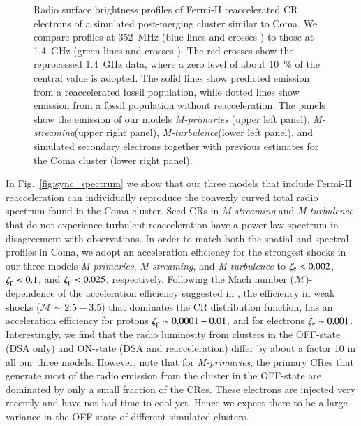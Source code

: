 \documentclass[useAMS,usenatbib]{mn2e}
\newcommand{\Mstream}{{\it M-streaming}\xspace}
\newcommand{\Mflatturb}{{\it M-turbulence}\xspace}
\newcommand{\Mprimary}{{\it M-primaries}\xspace}
\begin{document}
\begin{figure}
\begin{minipage}{1\columnwidth}
\begin{center}
   \end{center}
\end{minipage}
\caption{Radio surface brightness profiles of Fermi-II reaccelerated
  CR electrons of a simulated post-merging cluster similar to Coma. We
  compare profiles at 352~MHz (blue lines and crosses \citet{brown11})
  to those at 1.4~GHz (green lines and crosses \citet{deiss97}). The
  red crosses show the reprocessed 1.4~GHz data, where a zero level of
  about 10~\% of the central value is adopted. The solid lines show
  predicted emission from a reaccelerated fossil population, while
  dotted lines show emission from a fossil population without
  reacceleration. The panels show the emission of our models \Mprimary
  (upper left panel), \Mstream (upper right panel), \Mflatturb (lower
  left panel), and simulated secondary electrons together with
  previous estimates \citet{brunetti12} for the Coma cluster (lower
  right panel).}
  \label{fig:sync_profile}
\end{figure}

In Fig.~\ref{fig:sync_spectrum} we show that our three models that
include Fermi-II reacceleration can individually reproduce the
convexly curved total radio spectrum found in the Coma cluster. Seed
CRs in \Mstream and \Mflatturb that do not experience turbulent
reacceleration have a power-law spectrum in disagreement with
observations. In order to match both the spatial and spectral profiles
in Coma, we adopt an acceleration efficiency for the strongest shocks
in our three models \Mprimary, \Mstream, and \Mflatturb to
$\zeta_{{\mathrm{e}}} <0.002$, $\zeta_{{\mathrm{p}}} < 0.1$, and
$\zeta_{{\mathrm{p}}}<0.025$, respectively. Following the Mach number
($\mathcal{M}$)-dependence of the acceleration efficiency suggested in
\cite{pinzke13}, the efficiency in weak shocks ($\mathcal{M}\sim
2.5-3.5$) that dominates the CR distribution function, has an
acceleration efficiency for protons $\zeta_{{\mathrm{p}}}\sim0.0001-0.01$,
and for electrons $\zeta_{{\mathrm{e}}}\sim 0.001$. Interestingly, we find
that the radio luminosity from clusters in the OFF-state (DSA only)
and ON-state (DSA and reacceleration) differ by about a factor 10 in
all our three models. However, note that for \Mprimary, the primary
CRes that generate most of the radio emission from the cluster in the
OFF-state are dominated by only a small fraction of the CRes. These
electrons are injected very recently and have not had time to cool
yet. Hence we expect there to be a large variance in the OFF-state of
different simulated clusters.
\end{document}
